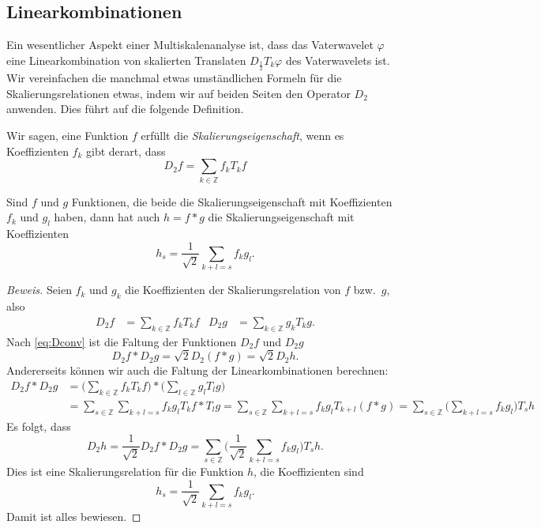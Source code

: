 \subsection{Linearkombinationen
\label{subsection:linearkombinationen}}
Ein wesentlicher Aspekt einer Multiskalenanalyse ist, dass das
Vaterwavelet $\varphi$ eine Linearkombination von skalierten
Translaten $D_{\frac12}T_k\varphi$ des Vaterwavelets ist.
Wir vereinfachen die manchmal etwas umständlichen Formeln für
die Skalierungsrelationen etwas, indem wir auf beiden Seiten
den Operator $D_2$ anwenden.
Dies führt auf die folgende Definition.

\begin{definition}
Wir sagen, eine Funktion $f$ erfüllt die {\em Skalierungseigenschaft},
wenn es Koeffizienten $f_k$ gibt derart, dass
\[
D_2f = \sum_{k\in\mathbb Z} f_k T_kf
\]
\end{definition}

\begin{satz}
\label{satz:faltung-linearkombination}
Sind $f$ und $g$ Funktionen, die beide die Skalierungseigenschaft
mit Koeffizienten $f_k$ und $g_l$
haben, dann hat auch $h=f*g$ die Skalierungseigenschaft
mit Koeffizienten
\begin{equation}
h_s = \frac1{\sqrt{2}} \sum_{k+l=s}f_kg_l.
\label{eq:faltung-linearkombination}
\end{equation}
\end{satz}

\begin{proof}[Beweis]
Seien $f_k$ und $g_k$ die Koeffizienten der Skalierungsrelation von $f$
bzw.~$g$, also
\begin{align*}
D_2f
&=
\sum_{k\in\mathbb Z} f_k T_kf
&
D_2g
&=
\sum_{k\in\mathbb Z} g_k T_kg.
\end{align*}
Nach \eqref{eq:Dconv} ist die Faltung der Funktionen $D_2f$ und $D_2g$
\[
D_2f * D_2g
=
\sqrt{2}
D_2(f*g)
=
\sqrt{2}
D_2h.
\]
Andererseits können wir auch die Faltung der Linearkombinationen 
berechnen:
\begin{align*}
D_2f * D_2g
&=
\biggl( \sum_{k\in\mathbb Z} f_kT_kf \biggr)
*
\biggl( \sum_{l\in\mathbb Z} g_lT_lg \biggr)
\\
&=
\sum_{s\in\mathbb Z}
\sum_{k+l=s} f_kg_l T_kf * T_lg
=
\sum_{s\in\mathbb Z}
\sum_{k+l=s} f_kg_l T_{k+l}(f * g)
=
\sum_{s\in\mathbb Z}
\biggl(\sum_{k+l=s} f_kg_l\biggr) T_sh
\end{align*}
Es folgt, dass
\[
D_2h
=
\frac1{\sqrt{2}} D_2f * D_2g
=
\sum_{s\in\mathbb Z}
\biggl(\frac1{\sqrt{2}}\sum_{k+l=s} f_kg_l\biggr) T_sh.
\]
Dies ist eine Skalierungsrelation für die Funktion $h$, die Koeffizienten
sind
\[
h_s = \frac1{\sqrt{2}} \sum_{k+l=s}f_kg_l.
\]
Damit ist alles bewiesen.
\end{proof}

